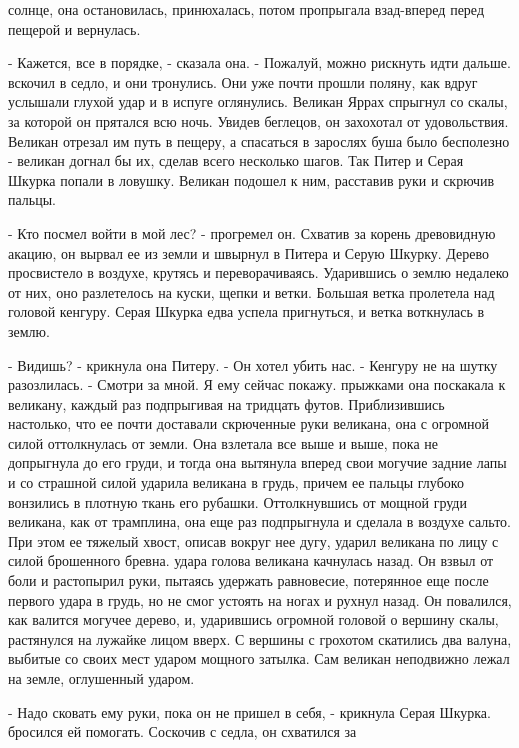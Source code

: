 солнце, она остановилась, принюхалась, потом пропрыгала взад-вперед 
перед пещерой и вернулась.
\par- Кажется, все в порядке, - сказала она. - Пожалуй, можно рискнуть 
идти дальше.
 вскочил в седло, и они тронулись. Они уже почти прошли 
поляну, как вдруг услышали глухой удар и в испуге оглянулись. Великан 
Яррах спрыгнул со скалы, за которой он прятался всю ночь. Увидев 
беглецов, он захохотал от удовольствия. Великан отрезал им путь в 
пещеру, а спасаться в зарослях буша было бесполезно - великан догнал 
бы их, сделав всего несколько шагов. Так Питер и Серая Шкурка попали в 
ловушку. Великан подошел к ним, расставив руки и скрючив пальцы.
\par- Кто посмел войти в мой лес? - прогремел он. Схватив за корень 
древовидную акацию, он вырвал ее из земли и швырнул в Питера и Серую 
Шкурку. Дерево просвистело в воздухе, крутясь и переворачиваясь. 
Ударившись о землю недалеко от них, оно разлетелось на куски, щепки и 
ветки. Большая ветка пролетела над головой кенгуру. Серая Шкурка едва 
успела пригнуться, и ветка воткнулась в землю.
\par- Видишь? - крикнула она Питеру. - Он хотел убить нас. - Кенгуру 
не на шутку разозлилась. - Смотри за мной. Я ему сейчас покажу.
 прыжками она поскакала к великану, каждый раз подпрыгивая 
на тридцать футов. Приблизившись настолько, что ее почти доставали 
скрюченные руки великана, она с огромной силой оттолкнулась от земли. 
Она взлетала все выше и выше, пока не допрыгнула до его груди, и тогда 
она вытянула вперед свои могучие задние лапы и со страшной силой 
ударила великана в грудь, причем ее пальцы глубоко вонзились в плотную 
ткань его рубашки. Оттолкнувшись от мощной груди великана, как от 
трамплина, она еще раз подпрыгнула и сделала в воздухе сальто. При 
этом ее тяжелый хвост, описав вокруг нее дугу, ударил великана по лицу 
с силой брошенного бревна.
 удара голова великана качнулась назад. Он взвыл от боли и 
растопырил руки, пытаясь удержать равновесие, потерянное еще после 
первого удара в грудь, но не смог устоять на ногах и рухнул назад. Он 
повалился, как валится могучее дерево, и, ударившись огромной головой 
о вершину скалы, растянулся на лужайке лицом вверх. С вершины с 
грохотом скатились два валуна, выбитые со своих мест ударом мощного 
затылка. Сам великан неподвижно лежал на земле, оглушенный ударом.
\par- Надо сковать ему руки, пока он не пришел в себя, - крикнула 
Серая Шкурка.
 бросился ей помогать. Соскочив с седла, он схватился за 
